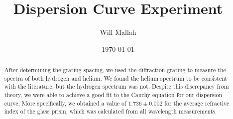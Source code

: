 \documentclass[12pt]{article}
\title{Dispersion Curve Experiment}
\author{Will Mallah}
\date{\today}
\begin{document}
\maketitle

\begin{abstract}
    After determining the grating spacing, we used the diffraction grating to measure the spectra of both hydrogen and helium. We found the helium spectrum to be consistent with the literature, but the hydrogen spectrum was not. Despite this discrepancy from theory, we were able to achieve a good fit to the Cauchy equation for our dispersion curve. More specifically, we obtained a value of $1.736 \pm 0.002$ for the average refractive index of the glass prism, which was calculated from all wavelength measurements.
\end{abstract}
\end{document}
